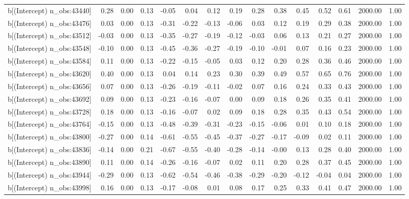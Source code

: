 \begin{table}[ht]
\begin{tabular}{rrrrrrrrrrrrrrr}
  b[(Intercept) n\_obs:43440] & 0.28 & 0.00 & 0.13 & -0.05 & 0.04 & 0.12 & 0.19 & 0.28 & 0.38 & 0.45 & 0.52 & 0.61 & 2000.00 & 1.00 \\ 
  b[(Intercept) n\_obs:43476] & 0.03 & 0.00 & 0.13 & -0.31 & -0.22 & -0.13 & -0.06 & 0.03 & 0.12 & 0.19 & 0.29 & 0.38 & 2000.00 & 1.00 \\ 
  b[(Intercept) n\_obs:43512] & -0.03 & 0.00 & 0.13 & -0.35 & -0.27 & -0.19 & -0.12 & -0.03 & 0.06 & 0.13 & 0.21 & 0.27 & 2000.00 & 1.00 \\ 
  b[(Intercept) n\_obs:43548] & -0.10 & 0.00 & 0.13 & -0.45 & -0.36 & -0.27 & -0.19 & -0.10 & -0.01 & 0.07 & 0.16 & 0.23 & 2000.00 & 1.00 \\ 
  b[(Intercept) n\_obs:43584] & 0.11 & 0.00 & 0.13 & -0.22 & -0.15 & -0.05 & 0.03 & 0.12 & 0.20 & 0.28 & 0.36 & 0.46 & 2000.00 & 1.00 \\ 
  b[(Intercept) n\_obs:43620] & 0.40 & 0.00 & 0.13 & 0.04 & 0.14 & 0.23 & 0.30 & 0.39 & 0.49 & 0.57 & 0.65 & 0.76 & 2000.00 & 1.00 \\ 
  b[(Intercept) n\_obs:43656] & 0.07 & 0.00 & 0.13 & -0.26 & -0.19 & -0.11 & -0.02 & 0.07 & 0.16 & 0.24 & 0.33 & 0.43 & 2000.00 & 1.00 \\ 
  b[(Intercept) n\_obs:43692] & 0.09 & 0.00 & 0.13 & -0.23 & -0.16 & -0.07 & 0.00 & 0.09 & 0.18 & 0.26 & 0.35 & 0.41 & 2000.00 & 1.00 \\ 
  b[(Intercept) n\_obs:43728] & 0.18 & 0.00 & 0.13 & -0.16 & -0.07 & 0.02 & 0.09 & 0.18 & 0.28 & 0.35 & 0.43 & 0.54 & 2000.00 & 1.00 \\ 
  b[(Intercept) n\_obs:43764] & -0.15 & 0.00 & 0.13 & -0.48 & -0.39 & -0.31 & -0.23 & -0.15 & -0.06 & 0.01 & 0.10 & 0.18 & 2000.00 & 1.00 \\ 
  b[(Intercept) n\_obs:43800] & -0.27 & 0.00 & 0.14 & -0.61 & -0.55 & -0.45 & -0.37 & -0.27 & -0.17 & -0.09 & 0.02 & 0.11 & 2000.00 & 1.00 \\ 
  b[(Intercept) n\_obs:43836] & -0.14 & 0.00 & 0.21 & -0.67 & -0.55 & -0.40 & -0.28 & -0.14 & -0.00 & 0.13 & 0.28 & 0.40 & 2000.00 & 1.00 \\ 
  b[(Intercept) n\_obs:43890] & 0.11 & 0.00 & 0.14 & -0.26 & -0.16 & -0.07 & 0.02 & 0.11 & 0.20 & 0.28 & 0.37 & 0.45 & 2000.00 & 1.00 \\ 
  b[(Intercept) n\_obs:43944] & -0.29 & 0.00 & 0.13 & -0.62 & -0.54 & -0.46 & -0.38 & -0.29 & -0.20 & -0.12 & -0.04 & 0.04 & 2000.00 & 1.00 \\ 
  b[(Intercept) n\_obs:43998] & 0.16 & 0.00 & 0.13 & -0.17 & -0.08 & 0.01 & 0.08 & 0.17 & 0.25 & 0.33 & 0.41 & 0.47 & 2000.00 & 1.00 \\ 

\end{tabular}
\end{table}
